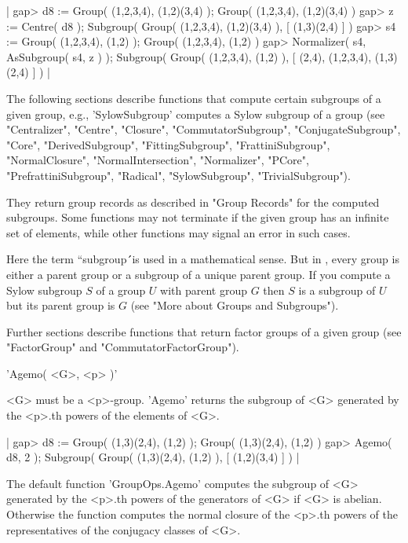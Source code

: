 |    gap> d8 := Group( (1,2,3,4), (1,2)(3,4) );
    Group( (1,2,3,4), (1,2)(3,4) )
    gap> z := Centre( d8 );
    Subgroup( Group( (1,2,3,4), (1,2)(3,4) ), [ (1,3)(2,4) ] )
    gap> s4 := Group( (1,2,3,4), (1,2) );
    Group( (1,2,3,4), (1,2) )
    gap> Normalizer( s4, AsSubgroup( s4, z ) );
    Subgroup( Group( (1,2,3,4), (1,2) ), [ (2,4), (1,2,3,4), (1,3)(2,4)
     ] ) |



The following sections describe functions that compute certain  subgroups
of  a given group, e.g.,  'SylowSubgroup' computes  a Sylow subgroup of a
group  (see  "Centralizer",  "Centre",  "Closure",  "CommutatorSubgroup",
"ConjugateSubgroup",    "Core",   "DerivedSubgroup",   "FittingSubgroup",
"FrattiniSubgroup", "NormalClosure", "NormalIntersection",  "Normalizer",
"PCore",   "PrefrattiniSubgroup",       "Radical",       "SylowSubgroup",
"TrivialSubgroup").

They  return  group  records as  described in  "Group  Records"  for  the
computed subgroups.  Some functions  may not terminate if the given group
has  an infinite set  of elements, while other functions  may  signal  an
error in such cases.

Here the term ``subgroup\'\'\ is used  in  a mathematical sense.  But  in
{\GAP},  every group is either a parent group or  a  subgroup of a unique
parent group.  If you compute a  Sylow subgroup  $S$ of a group $U$  with
parent group $G$ then $S$ is a  subgroup of $U$ but its  parent group  is
$G$ (see "More about Groups and Subgroups").

Further sections describe functions that return factor groups  of a given
group (see "FactorGroup" and "CommutatorFactorGroup").


'Agemo( <G>, <p> )'

<G> must be  a  <p>-group.  'Agemo' returns the subgroup of <G> generated
by the <p>.th powers of the elements of <G>.

|    gap> d8 := Group( (1,3)(2,4), (1,2) );
    Group( (1,3)(2,4), (1,2) )
    gap> Agemo( d8, 2 );
    Subgroup( Group( (1,3)(2,4), (1,2) ), [ (1,2)(3,4) ] ) |

The  default  function 'GroupOps.Agemo'  computes  the  subgroup  of  <G>
generated by  the  <p>.th powers  of the  generators  of  <G> if  <G>  is
abelian.   Otherwise  the  function computes  the  normal closure  of the
<p>.th powers of the representatives of the conjugacy classes of <G>.

